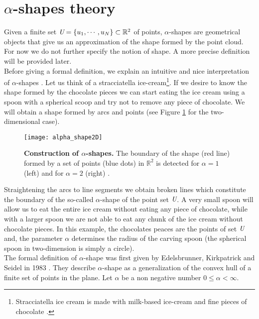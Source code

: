 \section{$\alpha$-shapes theory}\label{sec:alpha-shapes}
Given a finite set $\emph{U} = \{u_1, \cdots, u_N\}\subset \mathbb{R}^2$ of points, $\alpha$-shapes are geometrical objects that give us an approximation of the shape formed by the point cloud. For now we do not further specify the notion of shape. A more precise definition will be provided later.\\ \indent
Before giving a formal definition, we explain an intuitive and nice interpretation of $\alpha$-shapes \cite{lucieer2004alpha}. 
Let us think of a stracciatella ice-cream\footnote{Stracciatella ice cream is made with milk-based ice-cream and fine pieces of chocolate \cite{Wiki3}.}. If we desire to know the shape formed by the chocolate pieces we can start eating the ice cream using a spoon with a spherical scoop and try not to remove any piece of chocolate. 
We will obtain a shape formed by arcs and points (see Figure \ref{fig:shape2d} for the two-dimensional case).
\begin{figure}[t]\label{fig:shape2d}
\begin{center} 
\texttt{[image: alpha\_shape2D]}
\label{fig:shape}
\caption{\textbf{Construction of $\alpha$-shapes.} The boundary of the shape (red line) formed by a set of points (blue dots) in $\mathbb{R}^2$ is detected for $\alpha = 1$ (left) and for $\alpha=2$ (right) \cite{sabel2017application}.}
\label{fig:shape2d}
\end{center}
\end{figure}
Straightening the arcs to line segments we obtain broken lines which constitute the boundary of the so-called $\alpha$-shape of the point set $\emph{U}$. 
A very small spoon will allow us to eat the entire ice cream without eating any piece of chocolate, while with a larger spoon we are not able to eat any chunk of the ice cream without chocolate pieces. In this example, the chocolates peaces are the points of set $\emph{U}$ and, the parameter $\alpha$ determines the radius of the carving spoon (the spherical spoon in two-dimension is simply a circle).\\ \indent 
The formal definition of $\alpha$-shape was first given by Edelsbrunner, Kirkpatrick and Seidel in 1983 \cite{edelsbrunner1983shape}. They describe $\alpha$-shape as a generalization of the convex hull of a finite set of points in the plane. Let $\alpha$ be a non negative number $0\leq\alpha<\infty$. 
